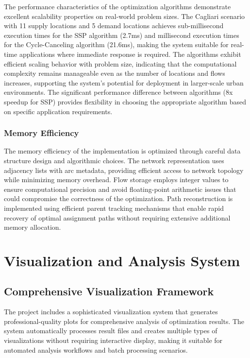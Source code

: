 \documentclass[12pt,a4paper]{article}
\begin{document}
The performance characteristics of the optimization algorithms demonstrate excellent scalability properties on real-world problem sizes. The Cagliari scenario with 11 supply locations and 5 demand locations achieves sub-millisecond execution times for the SSP algorithm (2.7ms) and millisecond execution times for the Cycle-Canceling algorithm (21.6ms), making the system suitable for real-time applications where immediate response is required. The algorithms exhibit efficient scaling behavior with problem size, indicating that the computational complexity remains manageable even as the number of locations and flows increases, supporting the system's potential for deployment in larger-scale urban environments. The significant performance difference between algorithms (8x speedup for SSP) provides flexibility in choosing the appropriate algorithm based on specific application requirements.

\subsubsection{Memory Efficiency}

The memory efficiency of the implementation is optimized through careful data structure design and algorithmic choices. The network representation uses adjacency lists with arc metadata, providing efficient access to network topology while minimizing memory overhead. Flow storage employs integer values to ensure computational precision and avoid floating-point arithmetic issues that could compromise the correctness of the optimization. Path reconstruction is implemented using efficient parent tracking mechanisms that enable rapid recovery of optimal assignment paths without requiring extensive additional memory allocation.

\section{Visualization and Analysis System}

\subsection{Comprehensive Visualization Framework}

The project includes a sophisticated visualization system that generates professional-quality plots for comprehensive analysis of optimization results. The system automatically processes result files and creates multiple types of visualizations without requiring interactive display, making it suitable for automated analysis workflows and batch processing scenarios.
\end{document}
